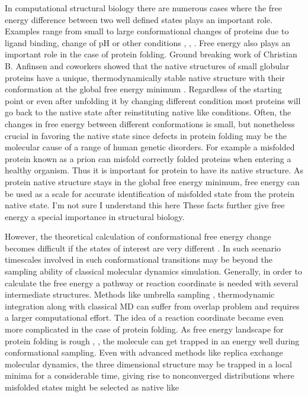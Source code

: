 \documentclass[12pt]{article}
\newcommand{\Alberto}[1]{\color{ForestGreen}#1\normalcolor }
\newcommand{\Arijit}[1]{\color{magenta}#1\normalcolor}
\begin{document}
In computational structural biology there are numerous cases where the free energy difference
between two well defined 
states plays an important role. Examples range from small to large conformational changes of proteins due to
ligand binding, change of pH or other conditions \cite{Meirovitch2007}, \cite{Chipot2007}, \cite{Jorgensen2004}. 
Free energy also plays an important role in the case of protein
folding. Ground breaking work of Christian B. Anfinsen and coworkers showed that the native
structures of small globular proteins have a unique, thermodynamically stable native structure with
their conformation at the global free energy minimum \cite{Anfinsen1973}. Regardless of the starting
point or even after unfolding 
it by changing different condition most proteins will go back to the native state after
reinstituting native like conditions. Often, the changes in free energy between different
conformations is small, but nonetheless crucial in favoring the native state
 since defects in protein folding may be the molecular cause of a range of human genetic disorders.
 For example a misfolded protein known as a
prion can misfold correctly folded proteins when entering a healthy organism. Thus it is important for 
protein to have its native structure. As protein native structure stays in the global free energy minimum, 
\Arijit{free energy can be used as a scale for accurate identification of misfolded state from the protein native state.}
\Alberto{I'm not sure I understand this here} 
These facts further give free energy a special importance in structural biology.

However, the theoretical calculation of conformational free energy change becomes difficult if the
states of interest are very different \cite{Meirovitch2007}. In such scenario timescales involved in
such conformational transitions may
be beyond the sampling ability of classical molecular dynamics simulation.  Generally, in order to
calculate the free energy a pathway or reaction coordinate is needed with several intermediate structures.
Methods like umbrella sampling \cite{Torrie1977}, thermodynamic integration \cite{Tironi1994} along with classical MD can suffer from
overlap problem and requires a larger computational effort. The idea of a reaction coordinate became
even more
complicated in the case of protein folding.  As free energy landscape for protein folding 
is rough \cite{Dill1997}, \cite{Dill2008}, the molecule 
can get trapped in an energy well during conformational sampling. Even with 
advanced methods like replica exchange molecular dynamics, the three dimensional structure may be
trapped in a local minima for a considerable time, giving rise to nonconverged distributions where
misfolded states might be selected as native like
\end{document}
